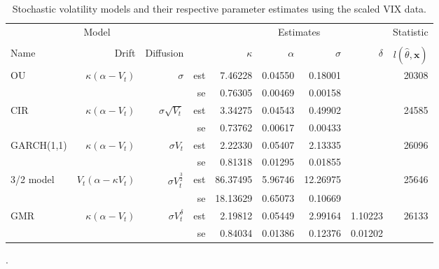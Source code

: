 	
	\begin{table}
		\newcommand{\ra}[1]{\renewcommand{\arraystretch}{#1}}
		\ra{1.3}
		\centering
		{\setlength{\tabcolsep}{0.35em}
			\begin{tabular}{@{}lrrrrrrrr@{}}
				\toprule
				\multicolumn{3}{c}{Model} & & \multicolumn{4}{c}{Estimates} & \multicolumn{1}{c}{Statistic}\\
				\cmidrule(){1-3} \cmidrule(r){5-8} \cmidrule(r){9-9}\\
				Name& Drift& Diffusion& & $\kappa$ & $\alpha$ & $\sigma$ & $\delta$ &  $l(\hat{\theta},\mathbf{x})$\\
				\midrule
				OU & $\kappa(\alpha - V_t)$ & $\sigma$ & est& 7.46228 & 0.04550 & 0.18001 & & 20308\\
				&	&	& se & 0.76305 & 0.00469 & 0.00158 & \\
				CIR & $\kappa(\alpha - V_t)$ & $\sigma\sqrt{V_t}$ & est&  3.34275&  0.04543 & 0.49902 &  & 24585\\
				&	&	& se & 0.73762 & 0.00617  & 0.00433  &  \\
				GARCH(1,1) & $\kappa(\alpha - V_t)$ & $\sigma V_t$ &  est & 2.22330  & 0.05407  & 2.13335  &  &26096  \\
				&	&	& se & 0.81318  & 0.01295	& 0.01855	&	\\
				3/2 model & $V_t(\alpha - \kappa V_t)$ & $\sigma V_t^{\frac{3}{2}}$ & est &	86.37495&	5.96746&	12.26975&  &25646	\\
				&	&	& se & 18.13629 &	0.65073&0.10669 & \\
				GMR & $\kappa(\alpha - V_t)$ & $\sigma V_t^\delta$ &  est & 2.19812  & 0.05449  & 2.99164  & 1.10223  &26133  \\
				&	&	& se & 0.84034  & 0.01386	& 0.12376	& 0.01202 & 	\\
				\bottomrule
			\end{tabular}}
			\caption[Parameter estimates for empirical data: scaled VIX] {Stochastic volatility models and their respective parameter estimates using the scaled VIX data.}
			\label{tab: table vix mle}
		\end{table}.
		
		
		
